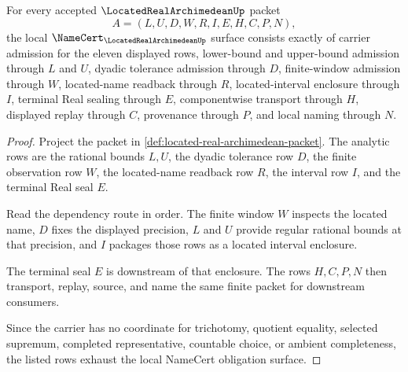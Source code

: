 \begin{theorem}
\label{thm:located-real-archimedean-namecert-obligations}
For every accepted $\LocatedRealArchimedeanUp$ packet
$$
A=(L,U,D,W,R,I,E,H,C,P,N),
$$
the local $\NameCert_{\LocatedRealArchimedeanUp}$ surface consists exactly of carrier admission for the eleven displayed rows, lower-bound and upper-bound admission through $L$ and $U$, dyadic tolerance admission through $D$, finite-window admission through $W$, located-name readback through $R$, located-interval enclosure through $I$, terminal Real sealing through $E$, componentwise transport through $H$, displayed replay through $C$, provenance through $P$, and local naming through $N$.
\end{theorem}
\begin{proof}
Project the packet in \autoref{def:located-real-archimedean-packet}. The analytic rows are the rational bounds $L,U$, the dyadic tolerance row $D$, the finite observation row $W$, the located-name readback row $R$, the interval row $I$, and the terminal Real seal $E$.

Read the dependency route in order. The finite window $W$ inspects the located name, $D$ fixes the displayed precision, $L$ and $U$ provide regular rational bounds at that precision, and $I$ packages those rows as a located interval enclosure.

The terminal seal $E$ is downstream of that enclosure. The rows $H,C,P,N$ then transport, replay, source, and name the same finite packet for downstream consumers.

Since the carrier has no coordinate for trichotomy, quotient equality, selected supremum, completed representative, countable choice, or ambient completeness, the listed rows exhaust the local NameCert obligation surface.
\end{proof}

